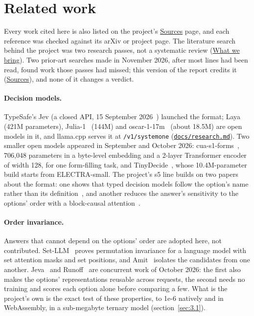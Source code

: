 \documentclass[10pt]{article}
\begin{document}
\section{Related work}\label{sec:2}

Every work cited here is also listed on the project's \href{https://maxgfr.github.io/skycmd/sources/}{Sources} page, and each reference was checked against its arXiv or project page. The literature search behind the project was two research passes, not a systematic review (\href{https://maxgfr.github.io/skycmd/novelty/\#what-it-does-not-bring-honestly}{What we bring}). Two prior-art searches made in November 2026, after most lines had been read, found work those passes had missed; this version of the report credits it (\href{https://maxgfr.github.io/skycmd/sources/\#related-work-found-later}{Sources}), and none of it changes a verdict.

\paragraph{Decision models.} TypeSafe's Jev (a closed API, 15 September 2026~\cite{jev}) launched the format; Laya~\cite{laya} (421M parameters), Julia-1~\cite{julia} (144M) and oscar-1-17m~\cite{oscar} (about 18.5M) are open models in it, and llama.cpp serves it at \texttt{/\allowbreak{}v1/\allowbreak{}systemone} (\href{https://github.com/maxgfr/skycmd/blob/main/docs/research.md}{\texttt{docs/\allowbreak{}research.md}}). Two smaller open models appeared in September and October 2026: cua-s1-forms~\cite{cua}, 706,048 parameters in a byte-level embedding and a 2-layer Transformer encoder of width 128, for one form-filling task, and TinyDecide~\cite{tinydecide}, whose 10.4M-parameter build starts from ELECTRA-small. The project's s5 line builds on two papers about the format: one shows that typed decision models follow the option's name rather than its definition~\cite{sun2026typesafe}, and another reduces the answer's sensitivity to the options' order with a block-causal attention~\cite{amit2026permutation}.

\paragraph{Order invariance.} Answers that cannot depend on the options' order are adopted here, not contributed. Set-LLM~\cite{egressy2025setllm} proves permutation invariance for a language model with set attention masks and set positions, and Amit~\cite{amit2026permutation} isolates the candidates from one another. Jeva~\cite{li2026jeva} and Runoff~\cite{huang2026runoff} are concurrent work of October 2026: the first also makes the options' representations reusable across requests, the second needs no training and scores each option alone before comparing a few. What is the project's own is the exact test of these properties, to 1e-6 natively and in WebAssembly, in a sub-megabyte ternary model (section~\ref{sec:3.1}).
\end{document}
